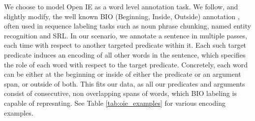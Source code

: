 





We choose to model Open IE as a word level annotation task. We follow,  and slightly modify, the well known BIO (Beginning, Inside, Outside)  annotation \cite{ramshaw1995text,sang1999representing},
often used in sequence labeling tasks such as noun phrase chunking, named entity recognition and SRL.
In our scenario, we annotate a sentence in multiple passes, each time with respect to another targeted predicate within it. Each such target predicate induces an encoding of all other words
in the sentence, which specifies the role of each word with respect to the target predicate.
Concretely, each word can be either at the beginning or inside of either the predicate or an argument span, or outside of both.
This fits our data, as all our predicates and arguments consist of consecutive, non overlapping spans of words, which BIO labeling is capable of represnting.
See Table \ref{tab:oie_examples} for various encoding examples.

